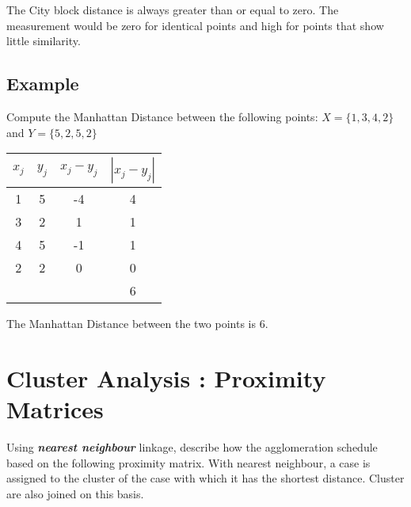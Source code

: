 \documentclass[SKLCluster.tex]{subfiles}
\begin{document}
The City block distance is always greater than or equal to zero. The measurement would be zero for identical points and high for points that show little similarity.

\subsection*{Example}
Compute the Manhattan Distance between the following points: 
$X = \{1,3,4,2\}$ and $Y = \{5,2,5,2\}$


\begin{center}
\begin{tabular}{|c|c|c|c|}
  \hline
$x_j$	&	$y_j$	&   $x_j - y_j$	&	$| x_j - y_j |$	\\ \hline
1	&	5	&	-4	&	4	\\
3	&	2	&	1	&	1	\\
4	&	5	&	-1	&	1	\\
2	&	2	&	0	&	0	\\ \hline
& & & 6 \\
  \hline
\end{tabular}
\end{center}
The Manhattan Distance between the two points is 6.

\newpage
\section{Cluster Analysis : Proximity Matrices}

Using \textbf{\textit{nearest neighbour}} linkage, describe how the agglomeration schedule based on the following 
proximity matrix. With nearest neighbour, a case is assigned to the cluster of the case with which it has the shortest distance. Cluster are also joined on this basis.
\end{document}
